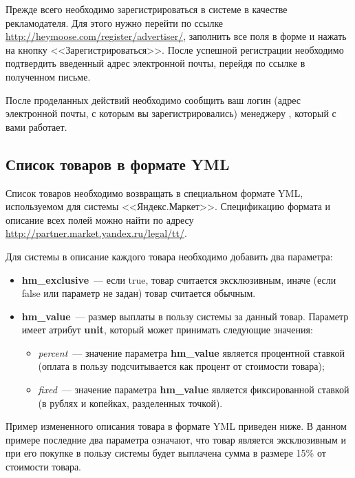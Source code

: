 \documentclass[a4paper,12pt]{article}
\begin{document}
Прежде всего необходимо зарегистрироваться в системе \heymoose{} в качестве рекламодателя. Для этого нужно перейти по ссылке \href{http://heymoose.com/register/advertiser/}{http://heymoose.com/register/advertiser/}, заполнить все поля в форме и нажать на кнопку <<Зарегистрироваться>>. После успешной регистрации необходимо подтвердить введенный адрес электронной почты, перейдя по ссылке в полученном письме.

После проделанных действий необходимо сообщить ваш логин (адрес электронной почты, с которым вы зарегистрировались) менеджеру \heymoose{}, который с вами работает.

\subsection{Список товаров в формате YML}

Список товаров необходимо возвращать в специальном формате YML, используемом для системы <<Яндекс.Маркет>>. Спецификацию формата и описание всех полей можно найти по адресу \href{http://partner.market.yandex.ru/legal/tt/}{http://partner.market.yandex.ru/legal/tt/}.

Для системы \heymoose{} в описание каждого товара необходимо добавить два параметра:
\begin{itemize}
\item \textbf{hm\_exclusive}~--- если true, товар считается эксклюзивным, иначе (если false или параметр не задан) товар считается обычным.
\item \textbf{hm\_value}~--- размер выплаты в пользу системы \heymoose{} за данный товар. Параметр имеет атрибут \textbf{unit}, который может принимать следующие значения:
	\begin{itemize}
	\item \textit{percent}~--- значение параметра \textbf{hm\_value} является процентной ставкой (оплата в пользу \heymoose{} подсчитывается как процент от стоимости товара);
	\item \textit{fixed}~--- значение параметра \textbf{hm\_value} является фиксированной ставкой (в рублях и копейках, разделенных точкой).
	\end{itemize}
\end{itemize}

Пример измененного описания товара в формате YML приведен ниже. В данном примере последние два параметра означают, что товар является эксклюзивным и при его покупке в пользу системы \heymoose{} будет выплачена сумма в размере 15\% от стоимости товара.
\end{document}

